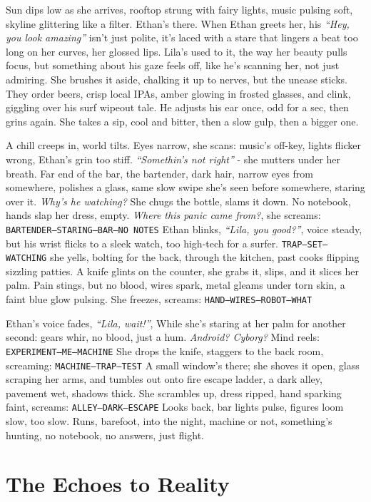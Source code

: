 \documentclass[12pt]{article}
\newcommand{\note}[1]{\texttt{#1}}
\begin{document}
Sun dips low as she arrives, rooftop strung with fairy lights, music pulsing soft, skyline glittering like a filter. Ethan’s there. When Ethan greets her, his \textit{“Hey, you look amazing”} isn’t just polite, it’s laced with a stare that lingers a beat too long on her curves, her glossed lips. Lila’s used to it, the way her beauty pulls focus, but something about his gaze feels off, like he’s scanning her, not just admiring. She brushes it aside, chalking it up to nerves, but the unease sticks. They order beers, crisp local IPAs, amber glowing in frosted glasses, and clink, giggling over his surf wipeout tale. He adjusts his ear once, odd for a sec, then grins again. She takes a sip, cool and bitter, then a slow gulp, then a bigger one.

A chill creeps in, world tilts. Eyes narrow, she scans: music’s off-key, lights flicker wrong, Ethan’s grin too stiff. \textit{“Somethin’s not right”} - she mutters under her breath. Far end of the bar, the bartender, dark hair, narrow eyes from somewhere, polishes a glass, same slow swipe she’s seen before somewhere, staring over it. \textit{Why’s he watching?} She chugs the bottle, slams it down. No notebook, hands slap her dress, empty. \textit{Where this panic came from?}, she screams: \note{BARTENDER—STARING—BAR—NO NOTES} Ethan blinks, \textit{“Lila, you good?”}, voice steady, but his wrist flicks to a sleek watch, too high-tech for a surfer. \note{TRAP—SET—WATCHING} she yells, bolting for the back, through the kitchen, past cooks flipping sizzling patties. A knife glints on the counter, she grabs it, slips, and it slices her palm. Pain stings, but no blood, wires spark, metal gleams under torn skin, a faint blue glow pulsing. She freezes, screams: \note{HAND—WIRES—ROBOT—WHAT}

Ethan’s voice fades, \textit{“Lila, wait!”}, While she’s staring at her palm for another second: gears whir, no blood, just a hum. \textit{Android? Cyborg?} Mind reels: \note{EXPERIMENT—ME—MACHINE} She drops the knife, staggers to the back room, screaming: \note{MACHINE—TRAP—TEST} A small window’s there; she shoves it open, glass scraping her arms, and tumbles out onto fire escape ladder, a dark alley, pavement wet, shadows thick. She scrambles up, dress ripped, hand sparking faint, screams: \note{ALLEY—DARK—ESCAPE} Looks back, bar lights pulse, figures loom slow, too slow. Runs, barefoot, into the night, machine or not, something’s hunting, no notebook, no answers, just flight.

\part{The Echoes to Reality}
\end{document}
